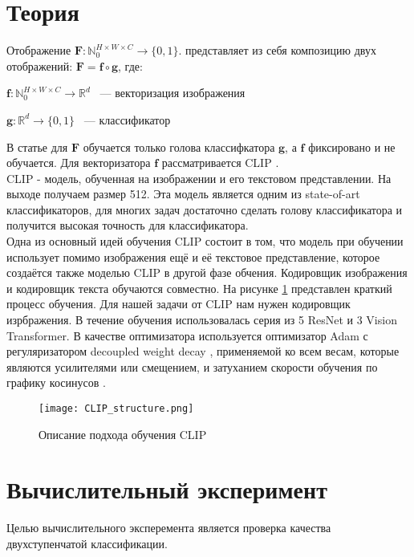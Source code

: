 \documentclass{article}
\begin{document}
\section{Теория}
\label{sec:theory}
Отображение $\bm{F}: \mathbb{N}_0^{H \times W \times C} \rightarrow \{ 0, 1 \}.$ представляет из себя композицию двух отображений: $\bm{F} = \bm{f} \circ \bm{g}$, где:
\begin{center}
    $\bm{f}: \mathbb{N}_0^{H \times W \times C} \rightarrow \mathbb{R}^{d}$ ~--- векторизация изображения
\end{center}
\begin{center}
    $\bm{g}: \mathbb{R}^{d} \rightarrow \{ 0, 1 \}$ ~--- классификатор
\end{center}
В статье для $\bm{F}$ обучается только голова классифкатора $\bm{g}$, а $\bm{f}$ фиксировано и не обучается. Для векторизатора $\bm{f}$ рассматривается CLIP \cite{CLIP} . \\

CLIP \cite{CLIP} - модель, обученная на изображении и его текстовом представлении. На выходе получаем размер 512. Эта модель является одним из state-of-art классификаторов, для многих задач достаточно сделать голову классификатора и получится высокая точность для классификатора. \\

Одна из основный идей обучения CLIP \cite{CLIP} состоит в том, что модель при обучении использует помимо изображения ещё и её текстовое представление, которое создаётся также моделью CLIP \cite{CLIP} в другой фазе обчения. Кодировщик изображения и кодировщик текста обучаются совместно. На рисунке \ref{fig:example_one} представлен краткий процесс обучения. Для нашей задачи от  CLIP \cite{CLIP} нам нужен кодировщик изрбражения. В течение обучения использовалась серия из 5 ResNet и 3 Vision Transformer. В качестве оптимизатора используется оптимизатор Adam \cite{Adam} с регуляризатором decoupled weight decay \cite{Requl}, применяемой ко всем весам, которые являются усилителями или смещением, и затуханием скорости обучения по графику косинусов \cite{Sgd}.  \\
\begin{figure}[ht]
    \centering
    \texttt{[image: CLIP\_structure.png]}
    \caption{Описание подхода обучения CLIP \cite{CLIP}}
    \label{fig:example_one}
\end{figure}


\section{Вычислительный эксперимент}
Целью вычислительного эксперемента является проверка качества двухступенчатой классификации. \\
\end{document}
